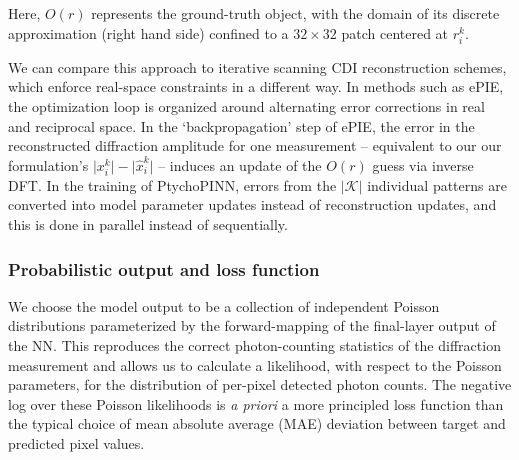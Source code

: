 \documentclass[sn-mathphys]{sn-jnl}%
\theoremstyle{thmstyleone}%
\theoremstyle{thmstyletwo}%
\theoremstyle{thmstylethree}%
\begin{document}
Here, $O(r)$ represents the ground-truth object, with the domain of its discrete approximation (right hand side) confined to a $32 \times 32$ patch centered at $r_i^k$.

We can compare this approach to iterative scanning CDI reconstruction schemes, which enforce real-space constraints in a different way. In methods such as ePIE, the optimization loop is organized around alternating error corrections in real and reciprocal space. In the `backpropagation' step of ePIE, the error in the reconstructed diffraction amplitude for one measurement -- equivalent to our our formulation's $\lvert x_i^k \rvert - \lvert \hat{x}_i^k \rvert $ -- induces an update of the $O(r)$ guess via inverse DFT. In the training of PtychoPINN, errors from the $\vert \mathcal{K} \vert$ individual patterns are converted into model parameter updates instead of reconstruction updates, and this is done in parallel instead of sequentially.




\subsubsection{Probabilistic output and loss function}

%

We choose the model output to be a collection of independent Poisson distributions parameterized by the forward-mapping of the final-layer output of the NN. This reproduces the correct photon-counting statistics of the diffraction measurement and allows us to calculate a likelihood, with respect to the Poisson parameters, for the distribution of per-pixel detected photon counts. The negative log over these Poisson likelihoods is \emph{a priori} a more principled loss function than the typical choice of mean absolute average (MAE) deviation between target and predicted pixel values.
\end{document}
